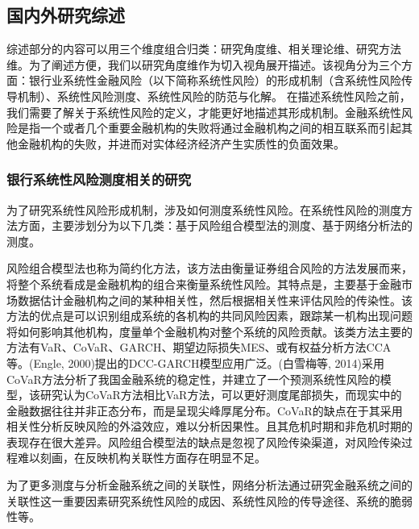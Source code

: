 \newpage
\subsection{国内外研究综述}

综述部分的内容可以用三个维度组合归类：研究角度维、相关理论维、研究方法维。为了阐述方便，我们以研究角度维作为切入视角展开描述。该视角分为三个方面：银行业系统性金融风险（以下简称系统性风险）的形成机制（含系统性风险传导机制）、系统性风险测度、系统性风险的防范与化解。
在描述系统性风险之前，我们需要了解关于系统性风险的定义，才能更好地描述其形成机制。金融系统性风险是指一个或者几个重要金融机构的失败将通过金融机构之间的相互联系而引起其他金融机构的失败，并进而对实体经济经济产生实质性的负面效果。


\subsubsection{银行系统性风险测度相关的研究}

为了研究系统性风险形成机制，涉及如何测度系统性风险。在系统性风险的测度方法方面，主要涉划分为以下几类：基于风险组合模型法的测度、基于网络分析法的测度。

风险组合模型法也称为简约化方法，该方法由衡量证券组合风险的方法发展而来，将整个系统看成是金融机构的组合来衡量系统性风险。其特点是，主要基于金融市场数据估计金融机构之间的某种相关性，然后根据相关性来评估风险的传染性。该方法的优点是可以识别组成系统的各机构的共同风险因素，跟踪某一机构出现问题将如何影响其他机构，度量单个金融机构对整个系统的风险贡献。该类方法主要的方法有VaR、CoVaR、GARCH、期望边际损失MES、或有权益分析方法CCA等。(Engle, 2000)提出的DCC-GARCH模型应用广泛。(白雪梅等, 2014)采用CoVaR方法分析了我国金融系统的稳定性，并建立了一个预测系统性风险的模型，该研究认为CoVaR方法相比VaR方法，可以更好测度尾部损失，而现实中的金融数据往往并非正态分布，而是呈现尖峰厚尾分布。CoVaR的缺点在于其采用相关性分析反映风险的外溢效应，难以分析因果性。且其危机时期和非危机时期的表现存在很大差异。风险组合模型法的缺点是忽视了风险传染渠道，对风险传染过程难以刻画，在反映机构关联性方面存在明显不足。

为了更多测度与分析金融系统之间的关联性，网络分析法通过研究金融系统之间的关联性这一重要因素研究系统性风险的成因、系统性风险的传导途径、系统的脆弱性等。

